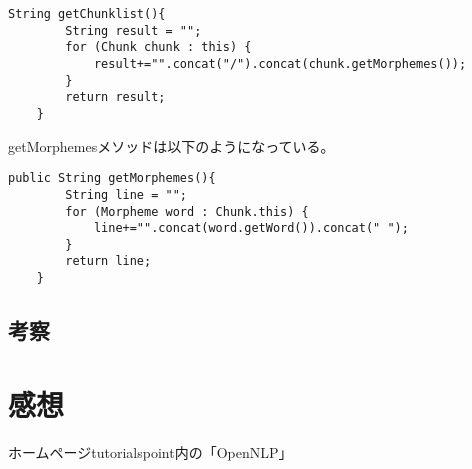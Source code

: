 \documentclass{jarticle}
\begin{document}
\begin{lstlisting}[caption=Sentence.java]
    String getChunklist(){
		String result = "";
		for (Chunk chunk : this) {
			result+="".concat("/").concat(chunk.getMorphemes());
		}
		return result;
	}
\end{lstlisting}
    getMorphemesメソッドは以下のようになっている。
\begin{lstlisting}[caption=Chunk.java]
    public String getMorphemes(){
		String line = "";
		for (Morpheme word : Chunk.this) {
			line+="".concat(word.getWord()).concat(" ");
		}
        return line;
    }
\end{lstlisting}

\subsection{考察}
    

\section{感想}

\begin{thebibliography}{99}
     ホームページtutorialspoint内の「OpenNLP」
\end{thebibliography}
\end{document}

